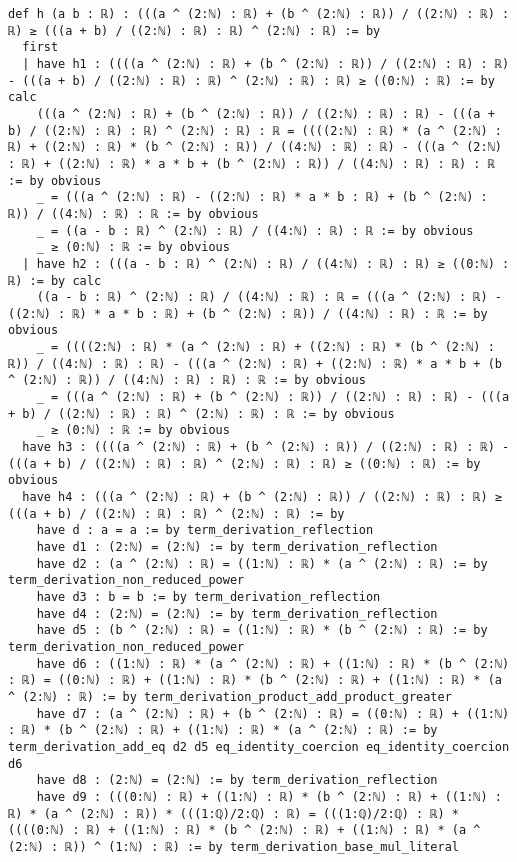\documentclass{article}
\begin{document}
\begin{tcolorbox}[colback=white!10, width=\linewidth]
\begin{lstlisting}[language=Lean4]
def h (a b : ℝ) : (((a ^ (2:ℕ) : ℝ) + (b ^ (2:ℕ) : ℝ)) / ((2:ℕ) : ℝ) : ℝ) ≥ (((a + b) / ((2:ℕ) : ℝ) : ℝ) ^ (2:ℕ) : ℝ) := by
  first
  | have h1 : ((((a ^ (2:ℕ) : ℝ) + (b ^ (2:ℕ) : ℝ)) / ((2:ℕ) : ℝ) : ℝ) - (((a + b) / ((2:ℕ) : ℝ) : ℝ) ^ (2:ℕ) : ℝ) : ℝ) ≥ ((0:ℕ) : ℝ) := by calc
    (((a ^ (2:ℕ) : ℝ) + (b ^ (2:ℕ) : ℝ)) / ((2:ℕ) : ℝ) : ℝ) - (((a + b) / ((2:ℕ) : ℝ) : ℝ) ^ (2:ℕ) : ℝ) : ℝ = ((((2:ℕ) : ℝ) * (a ^ (2:ℕ) : ℝ) + ((2:ℕ) : ℝ) * (b ^ (2:ℕ) : ℝ)) / ((4:ℕ) : ℝ) : ℝ) - (((a ^ (2:ℕ) : ℝ) + ((2:ℕ) : ℝ) * a * b + (b ^ (2:ℕ) : ℝ)) / ((4:ℕ) : ℝ) : ℝ) : ℝ := by obvious
    _ = (((a ^ (2:ℕ) : ℝ) - ((2:ℕ) : ℝ) * a * b : ℝ) + (b ^ (2:ℕ) : ℝ)) / ((4:ℕ) : ℝ) : ℝ := by obvious
    _ = ((a - b : ℝ) ^ (2:ℕ) : ℝ) / ((4:ℕ) : ℝ) : ℝ := by obvious
    _ ≥ (0:ℕ) : ℝ := by obvious
  | have h2 : (((a - b : ℝ) ^ (2:ℕ) : ℝ) / ((4:ℕ) : ℝ) : ℝ) ≥ ((0:ℕ) : ℝ) := by calc
    ((a - b : ℝ) ^ (2:ℕ) : ℝ) / ((4:ℕ) : ℝ) : ℝ = (((a ^ (2:ℕ) : ℝ) - ((2:ℕ) : ℝ) * a * b : ℝ) + (b ^ (2:ℕ) : ℝ)) / ((4:ℕ) : ℝ) : ℝ := by obvious
    _ = ((((2:ℕ) : ℝ) * (a ^ (2:ℕ) : ℝ) + ((2:ℕ) : ℝ) * (b ^ (2:ℕ) : ℝ)) / ((4:ℕ) : ℝ) : ℝ) - (((a ^ (2:ℕ) : ℝ) + ((2:ℕ) : ℝ) * a * b + (b ^ (2:ℕ) : ℝ)) / ((4:ℕ) : ℝ) : ℝ) : ℝ := by obvious
    _ = (((a ^ (2:ℕ) : ℝ) + (b ^ (2:ℕ) : ℝ)) / ((2:ℕ) : ℝ) : ℝ) - (((a + b) / ((2:ℕ) : ℝ) : ℝ) ^ (2:ℕ) : ℝ) : ℝ := by obvious
    _ ≥ (0:ℕ) : ℝ := by obvious
  have h3 : ((((a ^ (2:ℕ) : ℝ) + (b ^ (2:ℕ) : ℝ)) / ((2:ℕ) : ℝ) : ℝ) - (((a + b) / ((2:ℕ) : ℝ) : ℝ) ^ (2:ℕ) : ℝ) : ℝ) ≥ ((0:ℕ) : ℝ) := by obvious
  have h4 : (((a ^ (2:ℕ) : ℝ) + (b ^ (2:ℕ) : ℝ)) / ((2:ℕ) : ℝ) : ℝ) ≥ (((a + b) / ((2:ℕ) : ℝ) : ℝ) ^ (2:ℕ) : ℝ) := by
    have d : a = a := by term_derivation_reflection
    have d1 : (2:ℕ) = (2:ℕ) := by term_derivation_reflection
    have d2 : (a ^ (2:ℕ) : ℝ) = ((1:ℕ) : ℝ) * (a ^ (2:ℕ) : ℝ) := by term_derivation_non_reduced_power
    have d3 : b = b := by term_derivation_reflection
    have d4 : (2:ℕ) = (2:ℕ) := by term_derivation_reflection
    have d5 : (b ^ (2:ℕ) : ℝ) = ((1:ℕ) : ℝ) * (b ^ (2:ℕ) : ℝ) := by term_derivation_non_reduced_power
    have d6 : ((1:ℕ) : ℝ) * (a ^ (2:ℕ) : ℝ) + ((1:ℕ) : ℝ) * (b ^ (2:ℕ) : ℝ) = ((0:ℕ) : ℝ) + ((1:ℕ) : ℝ) * (b ^ (2:ℕ) : ℝ) + ((1:ℕ) : ℝ) * (a ^ (2:ℕ) : ℝ) := by term_derivation_product_add_product_greater
    have d7 : (a ^ (2:ℕ) : ℝ) + (b ^ (2:ℕ) : ℝ) = ((0:ℕ) : ℝ) + ((1:ℕ) : ℝ) * (b ^ (2:ℕ) : ℝ) + ((1:ℕ) : ℝ) * (a ^ (2:ℕ) : ℝ) := by term_derivation_add_eq d2 d5 eq_identity_coercion eq_identity_coercion d6
    have d8 : (2:ℕ) = (2:ℕ) := by term_derivation_reflection
    have d9 : (((0:ℕ) : ℝ) + ((1:ℕ) : ℝ) * (b ^ (2:ℕ) : ℝ) + ((1:ℕ) : ℝ) * (a ^ (2:ℕ) : ℝ)) * (((1:ℚ)/2:ℚ) : ℝ) = (((1:ℚ)/2:ℚ) : ℝ) * ((((0:ℕ) : ℝ) + ((1:ℕ) : ℝ) * (b ^ (2:ℕ) : ℝ) + ((1:ℕ) : ℝ) * (a ^ (2:ℕ) : ℝ)) ^ (1:ℕ) : ℝ) := by term_derivation_base_mul_literal

\end{lstlisting}
\end{tcolorbox}
\end{document}
